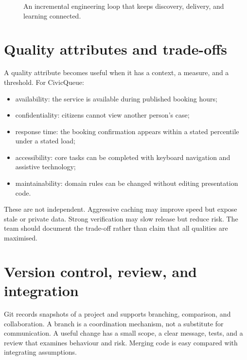 \begin{figure}[H]
\centering
{}
\caption{An incremental engineering loop that keeps discovery, delivery, and learning connected.}
\label{fig:engineering-loop}
\end{figure}

\section{Quality attributes and trade-offs}
A quality attribute becomes useful when it has a context, a measure, and a threshold. For CivicQueue:
\begin{itemize}
\item availability: the service is available during published booking hours;
\item confidentiality: citizens cannot view another person's case;
\item response time: the booking confirmation appears within a stated percentile under a stated load;
\item accessibility: core tasks can be completed with keyboard navigation and assistive technology;
\item maintainability: domain rules can be changed without editing presentation code.
\end{itemize}
These are not independent. Aggressive caching may improve speed but expose stale or private data. Strong verification may slow release but reduce risk. The team should document the trade-off rather than claim that all qualities are maximised.

\section{Version control, review, and integration}
Git records snapshots of a project and supports branching, comparison, and collaboration. A branch is a coordination mechanism, not a substitute for communication. A useful change has a small scope, a clear message, tests, and a review that examines behaviour and risk. Merging code is easy compared with integrating assumptions.

